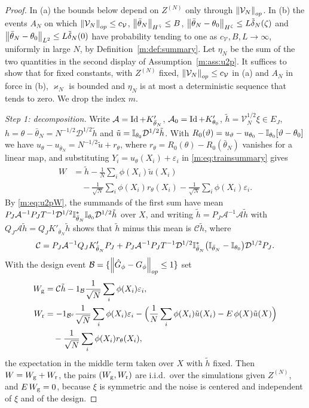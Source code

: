 \begin{proof}
In (a) the bounds below depend on $Z^{(N)}$ only through $\left\|\mathcal V_N\right\|_{op}$. In (b) the events $A_N$ on which $\left\|\mathcal V_N\right\|_{op}\le c_{\mathcal V}$, $\left\|\bar\theta_N\right\|_{H^{\bar\gamma}}\le B$, $\left\|\bar\theta_N-\theta_0\right\|_{H^\zeta}\le L\tilde\delta_N(\zeta)$ and $\left\|\bar\theta_N-\theta_0\right\|_{L^2}\le L\tilde\delta_N(0)$ have probability tending to one as $c_{\mathcal V},B,L\to\infty$, uniformly in large $N$, by Definition~\ref{m:def:summary}. Let $\eta_N$ be the sum of the two quantities in the second display of Assumption~\ref{m:ass:u2p}. It suffices to show that for fixed constants, with $Z^{(N)}$ fixed, $\left\|\mathcal V_N\right\|_{op}\le c_{\mathcal V}$ in (a) and $A_N$ in force in (b), $\varkappa_N$ is bounded and $\eta_N$ is at most a deterministic sequence that tends to zero. We drop the index $m$.

\emph{Step 1: decomposition.} Write $\mathcal A=\operatorname{Id}+K'_{\bar\theta_N}$, $\mathcal A_0=\operatorname{Id}+K'_{\theta_0}$, $\tilde h=\mathcal V_N^{1/2}\xi\in E_J$, $h=\theta-\bar\theta_N=N^{-1/2}\mathcal D^{1/2}\tilde h$ and $\tilde u=\mathbb{I}_{\theta_0}\mathcal D^{1/2}\tilde h$. With $R_0(\vartheta)=u_\vartheta-u_{\theta_0}-\mathbb{I}_{\theta_0}[\vartheta-\theta_0]$ we have $u_\theta-u_{\bar\theta_N}=N^{-1/2}\tilde u+r_\theta$, where $r_\theta=R_0(\theta)-R_0(\bar\theta_N)$ vanishes for a linear map, and substituting $Y_i=u_\theta(X_i)+\varepsilon_i$ in \eqref{m:eq:trainsummary} gives
\[
\begin{aligned}
W&=\tilde h-\frac1N\sum_i\phi(X_i)\tilde u(X_i)\\
&\quad-\frac1{\sqrt N}\sum_i\phi(X_i)r_\theta(X_i)-\frac1{\sqrt N}\sum_i\phi(X_i)\varepsilon_i .
\end{aligned}
\]
By \eqref{m:eq:u2pW}, the summands of the first sum have mean $P_J\mathcal A^{-1}P_JT^{-1}\mathcal D^{1/2}\mathbb{I}^*_{\bar\theta_N}\mathbb{I}_{\theta_0}\mathcal D^{1/2}\tilde h$ over $X$, and writing $\tilde h=P_J\mathcal A^{-1}\mathcal A\tilde h$ with $Q_J\mathcal A\tilde h=Q_JK'_{\bar\theta_N}\tilde h$ shows that $\tilde h$ minus this mean is $\mathcal C\tilde h$, where
\[
\mathcal C=P_J\mathcal A^{-1}Q_JK'_{\bar\theta_N}P_J+P_J\mathcal A^{-1}P_JT^{-1}\mathcal D^{1/2}\mathbb{I}^*_{\bar\theta_N}\big(\mathbb{I}_{\bar\theta_N}-\mathbb{I}_{\theta_0}\big)\mathcal D^{1/2}P_J .
\]
With the design event $\mathcal B=\{\left\|\hat G_\phi-G_\phi\right\|_{op}\le1\}$ set
\[
\begin{aligned}
W_{\rm g}&=\mathcal C\tilde h-1_{\mathcal B}\frac1{\sqrt N}\sum_i\phi(X_i)\varepsilon_i ,\\
W_{\rm r}&=-1_{\mathcal B^c}\frac1{\sqrt N}\sum_i\phi(X_i)\varepsilon_i-\Big(\frac1N\sum_i\phi(X_i)\tilde u(X_i)-E\,\phi(X)\tilde u(X)\Big)\\
&\quad-\frac1{\sqrt N}\sum_i\phi(X_i)r_\theta(X_i),
\end{aligned}
\]
the expectation in the middle term taken over $X$ with $\tilde h$ fixed. Then $W=W_{\rm g}+W_{\rm r}$, the pairs $(W_{\rm g},W_{\rm r})$ are i.i.d.\ over the simulations given $Z^{(N)}$, and $E\,W_{\rm g}=0$, because $\xi$ is symmetric and the noise is centered and independent of $\xi$ and of the design.


\end{proof}
